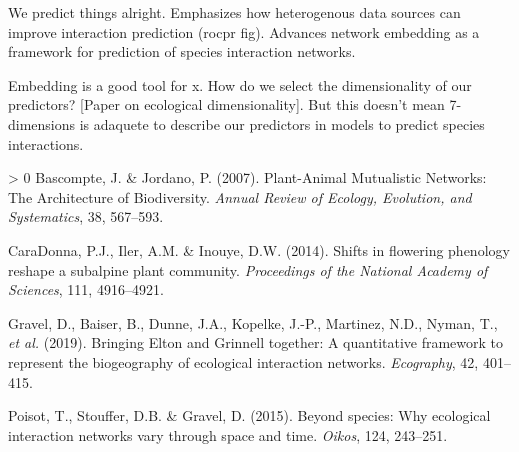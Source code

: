 \documentclass[11pt]{article}
\newlength{\cslhangindent}
\newenvironment{CSLReferences}[3] %
 {%
  \setlength{\parindent}{0pt}
  \ifodd #1 \everypar{\setlength{\hangindent}{\cslhangindent}}\ignorespaces\fi
  \ifnum #2 > 0
  \setlength{\parskip}{#2\baselineskip}
  \fi
 }%
 {}
\begin{document}
We predict things alright. Emphasizes how heterogenous data sources can
improve interaction prediction (rocpr fig). Advances network embedding
as a framework for prediction of species interaction networks.

Embedding is a good tool for x. How do we select the dimensionality of
our predictors? {[}Paper on ecological dimensionality{]}. But this
doesn't mean 7-dimensions is adaquete to describe our predictors in
models to predict species interactions.

\hypertarget{refs}{}
\begin{CSLReferences}{1}{0}
\leavevmode\hypertarget{ref-Bascompte2007PlaMut}{}%
Bascompte, J. \& Jordano, P. (2007). Plant-Animal Mutualistic Networks:
The Architecture of Biodiversity. \emph{Annual Review of Ecology,
Evolution, and Systematics}, 38, 567--593.

\leavevmode\hypertarget{ref-CaraDonna2014ShiFlo}{}%
CaraDonna, P.J., Iler, A.M. \& Inouye, D.W. (2014). Shifts in flowering
phenology reshape a subalpine plant community. \emph{Proceedings of the
National Academy of Sciences}, 111, 4916--4921.

\leavevmode\hypertarget{ref-Gravel2019BriElt}{}%
Gravel, D., Baiser, B., Dunne, J.A., Kopelke, J.-P., Martinez, N.D.,
Nyman, T., \emph{et al.} (2019). Bringing Elton and Grinnell together: A
quantitative framework to represent the biogeography of ecological
interaction networks. \emph{Ecography}, 42, 401--415.

\leavevmode\hypertarget{ref-Poisot2015SpeWhy}{}%
Poisot, T., Stouffer, D.B. \& Gravel, D. (2015). Beyond species: Why
ecological interaction networks vary through space and time.
\emph{Oikos}, 124, 243--251.

\end{CSLReferences}
\end{document}
